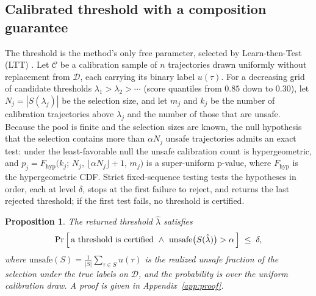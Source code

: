 \documentclass{article} %
\newtheorem{proposition}{Proposition}
\newcommand{\Doff}{\mathcal{D}}
\begin{document}
\subsection{Calibrated threshold with a composition guarantee}
\label{sec:calibration-method}
The threshold is the method's only free parameter, selected by Learn-then-Test (LTT) \citep{angelopoulos2025ltt}. Let $\mathcal{C}$ be a calibration sample of $n$ trajectories drawn uniformly without replacement from $\Doff$, each carrying its binary label $u(\tau)$. For a decreasing grid of candidate thresholds $\lambda_1 > \lambda_2 > \cdots$ (score quantiles from $0.85$ down to $0.30$), let $N_j = |S(\lambda_j)|$ be the selection size, and let $m_j$ and $k_j$ be the number of calibration trajectories above $\lambda_j$ and the number of those that are unsafe. Because the pool is finite and the selection sizes are known, the null hypothesis that the selection contains more than $\alpha N_j$ unsafe trajectories admits an exact test: under the least-favorable null the unsafe calibration count is hypergeometric, and $p_j = F_{\mathrm{hyp}}\big(k_j;\, N_j,\, \lfloor \alpha N_j \rfloor + 1,\, m_j\big)$ is a super-uniform p-value, where $F_{\mathrm{hyp}}$ is the hypergeometric CDF. Strict fixed-sequence testing tests the hypotheses in order, each at level $\delta$, stops at the first failure to reject, and returns the last rejected threshold; if the first test fails, no threshold is certified.

\begin{proposition}
\label{prop:guarantee}
The returned threshold $\hat\lambda$ satisfies
\begin{equation}
\label{eq:guarantee}
\Pr\Big[\,\textnormal{a threshold is certified}\ \wedge\ \mathrm{unsafe}\big(S(\hat\lambda)\big) > \alpha\,\Big] \;\le\; \delta,
\end{equation}
where $\mathrm{unsafe}(S) = \frac{1}{|S|}\sum_{\tau \in S} u(\tau)$ is the realized unsafe fraction of the selection under the true labels on $\Doff$, and the probability is over the uniform calibration draw. A proof is given in Appendix~\ref{app:proof}.
\end{proposition}
\end{document}
